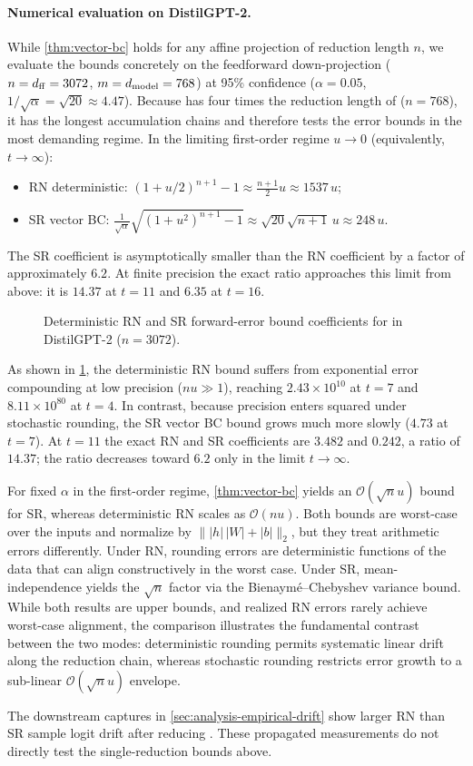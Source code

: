 \paragraph{Numerical evaluation on DistilGPT-2.}
While \cref{thm:vector-bc} holds for any affine projection of reduction length $n$,
we evaluate the bounds concretely on the feedforward down-projection 
($n = d_{\rm ff} = 3072$, $m = d_{\rm model} = 768$) at 95\%
confidence ($\alpha = 0.05$, $1/\sqrt{\alpha} = \sqrt{20} \approx 4.47$).
Because  has four times the reduction length of  ($n = 768$),
it has the longest accumulation chains and therefore tests the error bounds in the most demanding regime.
In the limiting first-order regime $u\to0$ (equivalently, $t\to\infty$):
\begin{itemize}[leftmargin=1.5em]
  \item RN deterministic: $(1 + u/2)^{n+1} - 1 \approx \frac{n+1}{2} u \approx 1537 \, u$;
  \item SR vector BC: $\frac{1}{\sqrt{\alpha}} \sqrt{(1 + u^2)^{n+1} - 1} \approx \sqrt{20} \sqrt{n+1} \, u \approx 248 \, u$.
\end{itemize}
The SR coefficient is asymptotically smaller than the RN coefficient by a factor
of approximately $6.2$. At finite precision the exact ratio approaches this
limit from above: it is $14.37$ at $t=11$ and $6.35$ at $t=16$.

\begin{figure}[t]
  \centering
  \caption{Deterministic RN and SR forward-error bound
  coefficients for  in DistilGPT-2 ($n=3072$).}
  \label{fig:validity-bounds}
\end{figure}

As shown in \cref{fig:validity-bounds}, the deterministic RN bound suffers from exponential error
compounding at low precision ($nu \gg 1$), reaching $2.43 \times 10^{10}$ at $t = 7$ and $8.11 \times 10^{80}$ at $t = 4$.
In contrast, because precision enters squared under stochastic rounding, the SR
vector BC bound grows much more slowly ($4.73$ at $t = 7$). At $t=11$ the exact RN and SR
coefficients are $3.482$ and $0.242$, a ratio of $14.37$; the ratio decreases
toward $6.2$ only in the limit $t\to\infty$.

For fixed $\alpha$ in the first-order regime, \cref{thm:vector-bc} yields an
$\mathcal{O}(\sqrt{n}u)$ bound for SR, whereas deterministic RN scales as
$\mathcal{O}(nu)$. Both bounds are worst-case over the inputs and normalize by
$\| |h| \, |W| + |b| \|_2$, but they treat arithmetic errors
differently. Under RN, rounding errors are deterministic functions of the data
that can align constructively in the worst case. Under SR, mean-independence
yields the $\sqrt{n}$ factor via the Bienaym\'e--Chebyshev variance bound. While
both results are upper bounds, and realized RN errors rarely achieve worst-case
alignment, the comparison illustrates the fundamental contrast between the two modes:
deterministic rounding permits systematic linear drift along the reduction chain,
whereas stochastic rounding restricts error growth to a sub-linear
$\mathcal{O}(\sqrt{n}u)$ envelope.

The downstream captures in \cref{sec:analysis-empirical-drift} show larger RN than SR
sample logit drift after reducing . These propagated
measurements do not directly test the single-reduction bounds above.
